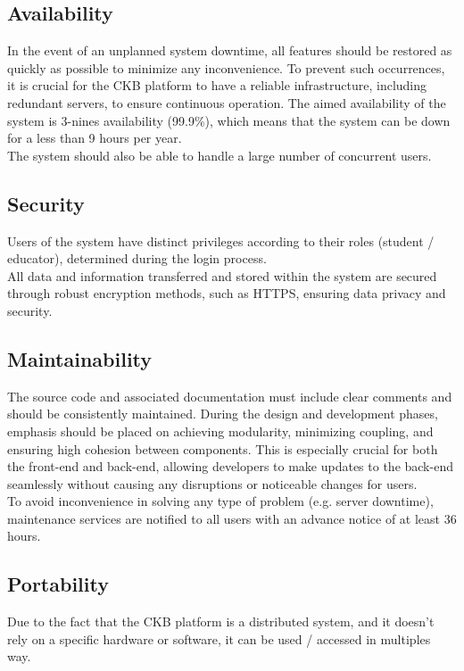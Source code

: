 \subsection{Availability}
In the event of an unplanned system downtime, all features should be restored as quickly as possible to minimize any inconvenience. To prevent such occurrences, it is crucial for the CKB platform to have a reliable infrastructure, including redundant servers, to ensure continuous operation.
The aimed availability of the system is 3-nines availability (99.9\%), which means that the system can be down for a less than 9 hours per year.\\
The system should also be able to handle a large number of concurrent users.

\subsection{Security}
Users of the system have distinct privileges according to their roles (student / educator), determined during the login process.\\
All data and information transferred and stored within the system are secured through robust encryption methods, such as HTTPS, ensuring data privacy and security.

\subsection{Maintainability}
The source code and associated documentation must include clear comments and should be consistently maintained. During the design and development phases, emphasis should be placed on achieving modularity, minimizing coupling, and ensuring high cohesion between components.
This is especially crucial for both the front-end and back-end, allowing developers to make updates to the back-end seamlessly without causing any disruptions or noticeable changes for users.\\
To avoid inconvenience in solving any type of problem (e.g. server downtime), maintenance services are notified to all users with an advance notice of at least 36 hours.

\subsection{Portability}
Due to the fact that the CKB platform is a distributed system, and it doesn't rely on a specific hardware or software, it can be used / accessed in multiples way.